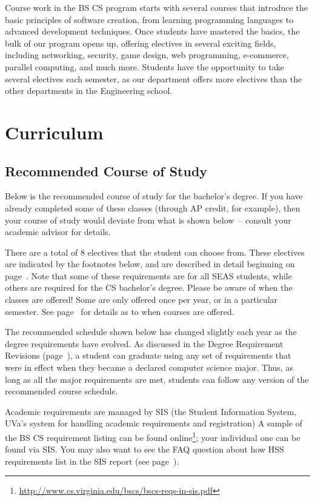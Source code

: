 \documentclass[10pt,letter]{book}
\newcommand{\mysection}[1]{\section{#1}\renewcommand{\rightmark}{#1}}
\newcommand{\myurl}[1]{\footnote{\scriptsize\url{#1}}}
\begin{document}
Course work in the BS CS program starts with several courses that
introduce the basic principles of software creation, from learning
programming languages to advanced development techniques.  Once
students have mastered the basics, the bulk of our program opens up,
offering electives in several exciting fields, including networking,
security, game design, web programming, e-commerce, parallel
computing, and much more.  Students have the opportunity to take
several electives each semester, as our department offers more
electives than the other departments in the Engineering school. 

\mysection{Curriculum}

\subsection{Recommended Course of Study}

Below is the recommended course of study for the bachelor's degree. If
you have already completed some of these classes (through AP credit,
for example), then your course of study would deviate from what is
shown below~-- consult your academic advisor for details.

There are a total of 8 electives that the student can choose
from. These electives are indicated by the footnotes below, and are
described in detail beginning on page~\pageref{sec:electiveinfo}. Note
that some of these requirements are for all SEAS students, while
others are required for the CS bachelor's degree. Please be aware of
when the classes are offered! Some are only offered once per year, or
in a particular semester. See page~\pageref{sec:coursedesc} for details
as to when courses are offered.

The recommended schedule shown below has changed slightly each year as
the degree requirements have evolved. As discussed in the Degree
Requirement Revisions (page~\pageref{sec:degreerevisions}), a student
can graduate using any set of requirements that were in effect when
they became a declared computer science major. Thus, as long as all
the major requirements are met, students can follow any version of the
recommended course schedule.

Academic requirements are managed by SIS (the Student Information
System, UVa’s system for handling academic requirements and
registration) A sample of the BS CS requirement listing can be found
online\myurl{http://www.cs.virginia.edu/bscs/bscs-reqs-in-sis.pdf};
your individual one can be found via SIS. You may also want to see the
FAQ question about how HSS requirements list in the SIS report (see
page~\pageref{sec:sishssissue}).
\end{document}
